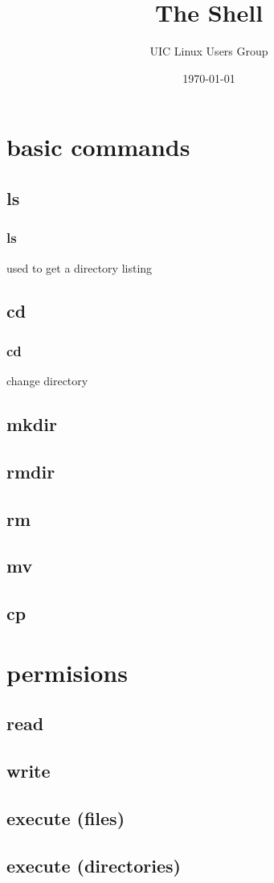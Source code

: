 \documentclass[hyperref={pdfpagelabels=false}]{beamer}
\title{The Shell}
\author{UIC Linux Users Group}
\date{\today}
\begin{document}
\frame{\titlepage}
\section[outline]{}
\frame{\tableofcontents}
\section{basic commands}
\subsection{ls}
\frame
{
	\frametitle{ls}
	used to get a directory listing
}
\subsection{cd}
\frame
{
	\frametitle{cd}
	change directory
}
\subsection{mkdir}
\subsection{rmdir}
\subsection{rm}
\subsection{mv}
\subsection{cp}
\section{permisions}
\subsection{read}
\subsection{write}
\subsection{execute (files)}
\subsection{execute (directories)}
\end{document}
